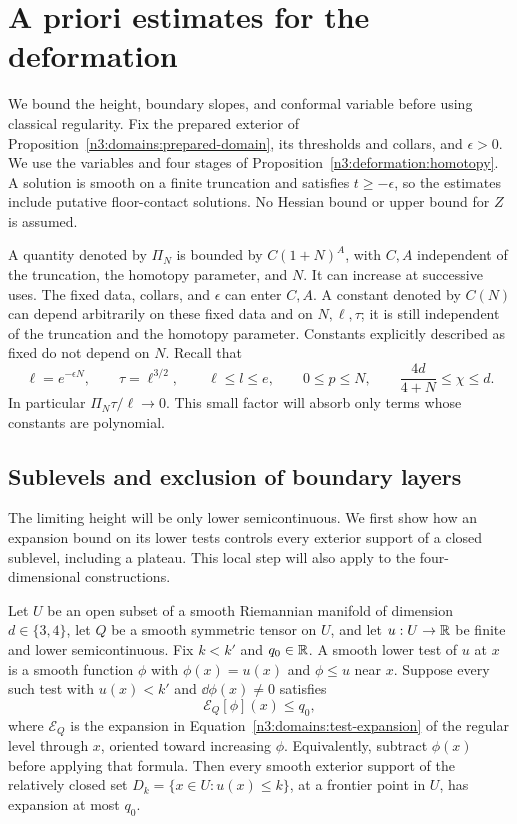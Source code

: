 \section{A priori estimates for the deformation}
\label{n3:apriori:section}

We bound the height, boundary slopes, and conformal variable before
using classical regularity. Fix the prepared exterior of
Proposition~\ref{n3:domains:prepared-domain}, its thresholds and collars,
and $\epsilon>0$. We use the variables and four stages of
Proposition~\ref{n3:deformation:homotopy}. A solution is smooth on a finite
truncation and satisfies $t\ge-\epsilon$, so the estimates include
putative floor-contact solutions. No Hessian bound or upper bound for
$Z$ is assumed.

A quantity denoted by $\Pi_N$
is bounded by $C(1+N)^A$, with $C,A$ independent of the truncation,
the homotopy parameter, and $N$.  It can increase at successive uses.
The fixed data, collars, and $\epsilon$ can enter $C,A$.  A constant
denoted by $C(N)$ can depend arbitrarily on these fixed data and on
$N,\ell,\tau$; it is still independent of the truncation and the
homotopy parameter.  Constants explicitly described as fixed do not
depend on $N$.  Recall that
\begin{equation}
 \ell=e^{-\epsilon N},\qquad \tau=\ell^{3/2},\qquad
 \ell\le l\le e,\qquad 0\le p\le N,
 \qquad \frac{4d}{4+N}\le\chi\le d.
 \label{n3:apriori:parameter-comparisons}
\end{equation}
In particular $\Pi_N\tau/\ell\to0$. This small factor will absorb
only terms whose constants are polynomial.

\subsection{Sublevels and exclusion of boundary layers}

The limiting height will be only lower semicontinuous.  We first show
how an expansion bound on its lower tests controls every exterior
support of a closed sublevel, including a plateau.  This local step
will also apply to the four-dimensional constructions.

\begin{lemma}
\label{n3:apriori:sublevel-support}
Let $U$ be an open subset of a smooth Riemannian manifold of dimension
$d\in\{3,4\}$, let $Q$ be a smooth symmetric tensor on $U$, and let
$u:U\to\mathbb R$ be finite and lower semicontinuous.  Fix $k<k'$ and
$q_0\in\mathbb R$.  A smooth lower test of $u$ at $x$ is a smooth function
$\phi$ with $\phi(x)=u(x)$ and $\phi\le u$ near $x$.
Suppose every such test with $u(x)<k'$ and $\dd\phi(x)\ne0$ satisfies
\[
 \mathcal E_Q[\phi](x)\le q_0,
\]
where $\mathcal E_Q$ is the expansion in
Equation~\eqref{n3:domains:test-expansion} of the regular level through
$x$, oriented toward increasing $\phi$.  Equivalently, subtract
$\phi(x)$ before applying that formula.
Then every smooth exterior support of the relatively closed set
$D_k=\{x\in U:u(x)\le k\}$, at a frontier point in $U$, has
expansion at most $q_0$.
\end{lemma}

